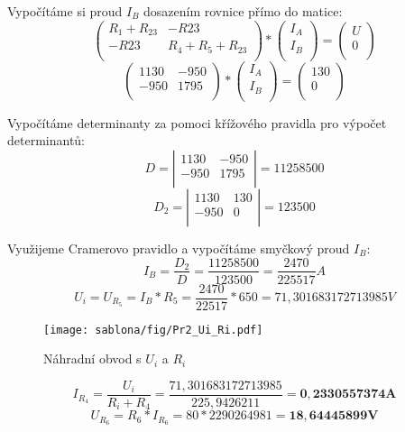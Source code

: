 Vypočítáme si proud $I_B$ dosazením rovnice přímo do matice:
\[
\left(
\begin{array}{cc}
R_1 +R_{23} & -R{23}\\
-R{23} & R_4+R_5+R_{23}\\
\end{array}
\right)
*
\left(
\begin{array}{c}
I_A\\
I_B\\
\end{array}
\right)
=
\left(
\begin{array}{c}
U\\
0\\
\end{array}
\right)
\]
\[
\left(
\begin{array}{cc}
1130 & -950\\
-950 & 1795\\
\end{array}
\right)
*
\left(
\begin{array}{c}
I_A\\
I_B\\
\end{array}
\right)
=
\left(
\begin{array}{c}
130\\
0\\
\end{array}
\right)
\]
\newline

Vypočítáme determinanty za pomoci křížového pravidla pro výpočet determinantů:
\[
D = 
\left|
\begin{array}{cc}
1130 & -950\\
-950 & 1795\\
\end{array}
\right|
= 11258500
\]
\newline
\[
D_2 = 
\left|
\begin{array}{cc}
1130 & 130\\
-950 & 0\\
\end{array}
\right|
= 123500
\]
\newline

Využijeme Cramerovo pravidlo a vypočítáme smyčkový proud $I_B$:
$$I_B = \frac{D_2}{D} = \frac{11258500}{123500} = \frac{2470}{225517}A$$
$$U_i = U_{R_5} = I_B*R_5 = \frac{2470}{22517}*650 = 71,301683172713985V$$
\newpage

\begin{figure}[htb]
    \centering
    \texttt{[image: sablona/fig/Pr2\_Ui\_Ri.pdf]} \\
    \caption{Náhradní obvod s $U_i$ a $R_i$}
    \end{figure}

$$I_{R_4} = \frac{U_i}{R_i + R_4} = \frac{71,301683172713985}{225,9426211} = \mathbf{0,2330557374A}$$
$$U_{R_6} = R_6*I_{R_6} = 80 *  2290264981 = \mathbf{18,64445899V}$$